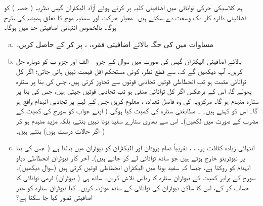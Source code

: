 ہم کلاسیکی حرکی توانائی  میں اضافیتی کلیہ  پر کرتے ہوئے آزاد الیکٹران گیس نظریہ ( حصہ ) کو اضافیتی دائرہ کار تک وسعت دے سکتے ہیں۔ معیار حرکت اور سمتیہ موج کا تعلق ہمیشہ کی طرح  ہوگا۔ بالخصوص انتہائی اضافیتی حد میں  ہوگا۔ 
\begin{enumerate}[a.]
\item
مساوات  میں  کی جگہ بالائے اضافیتی فقرہ، ، پر کر کے  حاصل کریں۔
\item
بالائے اضافیتی الیکٹران گیس کی صورت میں سوال  کے جزو - الف اور جزو-ب کو دوبارہ حل کریں۔ آپ دیکھیں گے کہ،  سے قطع نظر، کوئی مستحکم اقل قیمت نہیں پائی جاتی؛ اگر کل توانائی مثبت ہو تب انحطاطی قوتیں تجاذبی قوتوں سے تجاوز کرتی ہیں، جس کی بنا پر ستارہ پھولے گا، اس کے برعکس اگر کل توانائی منفی ہو تب تجاذبی قوتيں جیتی ہیں، جس کی بنا پر ستارہ منہدم ہو گا۔ مرکزویہ کی وہ فاصل تعداد، ، معلوم کریں جس کے لیے  پر تجاذبی انہدام واقع ہو گا۔ اس کو  کہتے ہیں۔  ۔ مطابقتی ستارہ کی کمیت کیا ہوگی ( اپنے جواب کو سورج کی کمیت کے مضرب کے صورت میں لکھیں)۔ اس سے بھاری ستارے سفید بونا نہیں بنتے، بلکہ مزید منہدم ہو کر ( اگر حالات درست ہوں)  بنتے ہیں۔
\item
انتہائی زیادہ کثافت پر، ، ، تقریباً تمام پروٹان اور الیکٹران کو نیوٹران میں بدلتا ہے ( جس کی بنا پر نیوٹرینو خارج ہوتے ہیں جو ساتھ توانائی لے کر جاتے ہیں)۔ آخر کار نیوٹران انحطاطی دباو انہدام کو روکتا ہے، جیسا کہ سفید بونا میں الیکٹران انحطاطی قوتیں کرتی ہیں (سوال  دیکھیں)۔ سورج کے برابر کمیت کے نیوٹران ستارہ کا رداس تلاش کریں۔ ساتھ ہی ( نیوٹران) فرمی توانائی کا حساب کر کے، اس کا ساکن نیوٹران کی توانائی کے ساتھ موازنہ کریں۔ کیا نیوٹران ستارہ کو غیر اضافیتی تصور کیا جا سکتا ہے؟ 
\end{enumerate}
